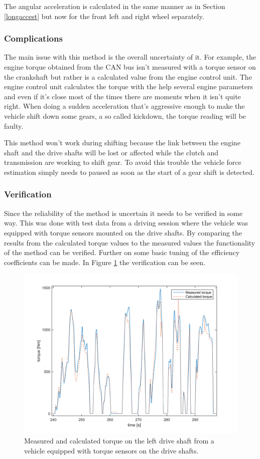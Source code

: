 The angular acceleration is calculated in the same manner as in Section \ref{longaccest} but now for the front left and right wheel separately.


\subsubsection{Complications}
The main issue with this method is the overall uncertainty of it. For example, the engine torque obtained from the CAN bus isn't measured with a torque sensor on the crankshaft but rather is a calculated value from the engine control unit. The engine control unit calculates the torque with the help several engine parameters and even if it's close most of the times there are moments when it isn't quite right. When doing a sudden acceleration that's aggressive enough to make the vehicle shift down some gears, a so called kickdown, the torque reading will be faulty. 

This method won't work during shifting because the link between the engine shaft and the drive shafts will be lost or affected while the clutch and transmission are working to shift gear. To avoid this trouble the vehicle force estimation simply needs to paused as soon as the start of a gear shift is detected.

\subsubsection{Verification}
Since the reliability of the method is uncertain it needs to be verified in some way. This was done with test data from a driving session where the vehicle was equipped with torque sensors mounted on the drive shafts. By comparing the results from the calculated torque values to the measured values the functionality of the method can be verified. Further on some basic tuning of the efficiency coefficients can be made. In Figure \ref{torque_ver} the verification can be seen.

\begin{figure}[h]
	\centering
	\includegraphics[width=1\textwidth]{Pictures/torque_ver}
	\caption{Measured and calculated torque on the left drive shaft from a vehicle equipped with torque sensors on the drive shafts.}
	\label{torque_ver}
\end{figure}

